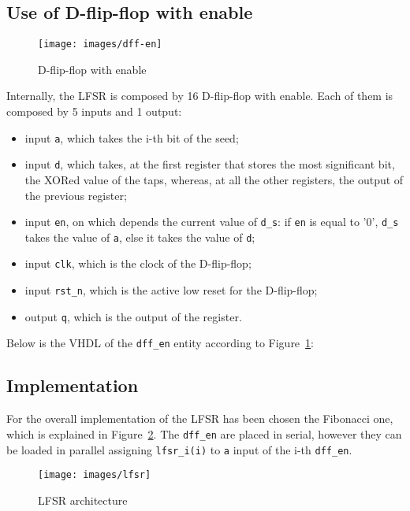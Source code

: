 \documentclass[11pt,a4paper,oneside, openright]{article}
\begin{document}
\subsection{Use of D-flip-flop with enable}

\begin{figure}[h]
    \centering
    \texttt{[image: images/dff-en]}
    \caption{D-flip-flop with enable}
    \label{fig:dff-en}
\end{figure}

Internally, the LFSR is composed by 16 D-flip-flop with enable. Each of them is composed by 5 inputs and 1 output:
\begin{itemize}
    \item input \texttt{a}, which takes the i-th bit of the seed;
    \item input \texttt{d}, which takes, at the first register that stores the most significant bit, the XORed value of the taps, whereas, at all the other registers, the output of the previous register;
    \item input \texttt{en}, on which depends the current value of \texttt{d\_s}: if \texttt{en} is equal to '0', \texttt{d\_s} takes the value of \texttt{a}, else it takes the value of \texttt{d};
    \item input \texttt{clk}, which is the clock of the D-flip-flop;
    \item input \texttt{rst\_n}, which is the active low reset for the D-flip-flop;
    \item output \texttt{q}, which is the output of the register.
    \end{itemize}
  
Below is the VHDL of the \texttt{dff\_en} entity according to Figure~\ref{fig:dff-en}:



\subsection{Implementation}
For the overall implementation of the LFSR has been chosen the Fibonacci one, which is explained in Figure~\ref{fig:lfsr}. The \texttt{dff\_en} are placed in serial, however they can be loaded in parallel assigning \texttt{lfsr\_i(i)} to \texttt{a} input of the i-th \texttt{dff\_en}.

\begin{figure}[h]
    \centering
    \texttt{[image: images/lfsr]}
    \caption{LFSR architecture}
    \label{fig:lfsr}
\end{figure}
\end{document}
